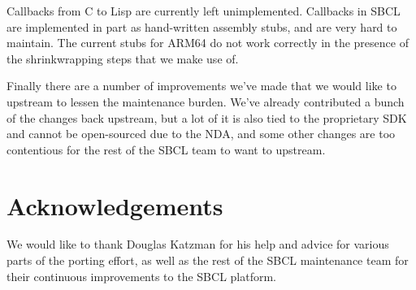 \documentclass[format=sigconf]{acmart}
\begin{document}
Callbacks from C to Lisp are currently left unimplemented. Callbacks in SBCL are implemented in part as hand-written assembly stubs, and are very hard to maintain. The current stubs for ARM64 do not work correctly in the presence of the shrinkwrapping steps that we make use of.

Finally there are a number of improvements we've made that we would like to upstream to lessen the maintenance burden. We've already contributed a bunch of the changes back upstream, but a lot of it is also tied to the proprietary SDK and cannot be open-sourced due to the NDA, and some other changes are too contentious for the rest of the SBCL team to want to upstream.

\section{Acknowledgements}\label{acknowledgements}
We would like to thank Douglas Katzman for his help and advice for various parts of the porting effort, as well as the rest of the SBCL maintenance team for their continuous improvements to the SBCL platform.


\end{document}
